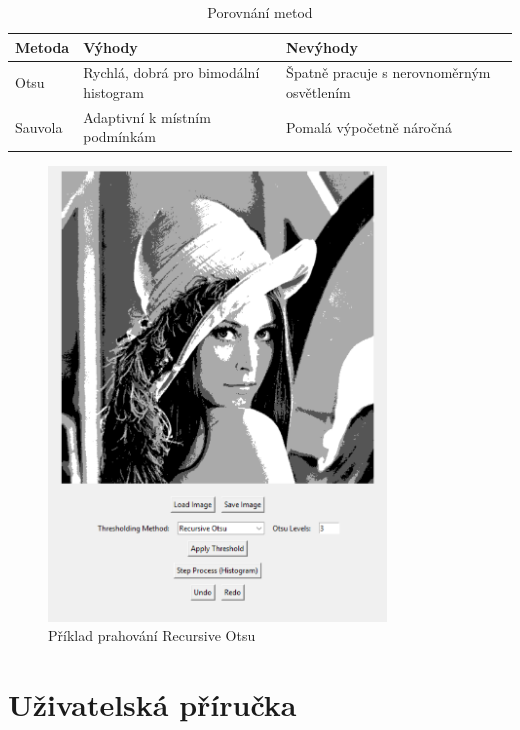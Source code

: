 \documentclass[12pt,a4paper]{article}
\begin{document}
\begin{table}[h]
\centering
\caption{Porovnání metod}
\begin{tabular}{|l|l|l|}
\hline
Metoda & Výhody & Nevýhody \\
\hline
Otsu & Rychlá, dobrá pro bimodální histogram & Špatně pracuje s nerovnoměrným osvětlením \\
Sauvola & Adaptivní k místním podmínkám & Pomalá výpočetně náročná \\
\hline
\end{tabular}
\end{table}
\newpage
\begin{figure}[h]
\centering
\includegraphics[width=0.8\textwidth]{otsu.png}
\caption{Příklad prahování Recursive Otsu}
\label{fig:vysledky}
\end{figure}


\section{Uživatelská příručka}
\end{document}
